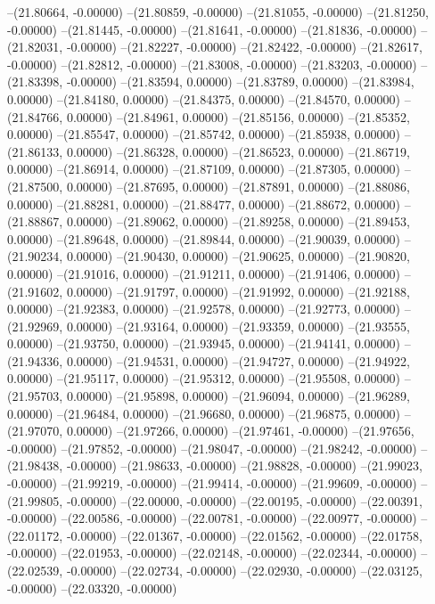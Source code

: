 --(21.80664, -0.00000)
--(21.80859, -0.00000)
--(21.81055, -0.00000)
--(21.81250, -0.00000)
--(21.81445, -0.00000)
--(21.81641, -0.00000)
--(21.81836, -0.00000)
--(21.82031, -0.00000)
--(21.82227, -0.00000)
--(21.82422, -0.00000)
--(21.82617, -0.00000)
--(21.82812, -0.00000)
--(21.83008, -0.00000)
--(21.83203, -0.00000)
--(21.83398, -0.00000)
--(21.83594, 0.00000)
--(21.83789, 0.00000)
--(21.83984, 0.00000)
--(21.84180, 0.00000)
--(21.84375, 0.00000)
--(21.84570, 0.00000)
--(21.84766, 0.00000)
--(21.84961, 0.00000)
--(21.85156, 0.00000)
--(21.85352, 0.00000)
--(21.85547, 0.00000)
--(21.85742, 0.00000)
--(21.85938, 0.00000)
--(21.86133, 0.00000)
--(21.86328, 0.00000)
--(21.86523, 0.00000)
--(21.86719, 0.00000)
--(21.86914, 0.00000)
--(21.87109, 0.00000)
--(21.87305, 0.00000)
--(21.87500, 0.00000)
--(21.87695, 0.00000)
--(21.87891, 0.00000)
--(21.88086, 0.00000)
--(21.88281, 0.00000)
--(21.88477, 0.00000)
--(21.88672, 0.00000)
--(21.88867, 0.00000)
--(21.89062, 0.00000)
--(21.89258, 0.00000)
--(21.89453, 0.00000)
--(21.89648, 0.00000)
--(21.89844, 0.00000)
--(21.90039, 0.00000)
--(21.90234, 0.00000)
--(21.90430, 0.00000)
--(21.90625, 0.00000)
--(21.90820, 0.00000)
--(21.91016, 0.00000)
--(21.91211, 0.00000)
--(21.91406, 0.00000)
--(21.91602, 0.00000)
--(21.91797, 0.00000)
--(21.91992, 0.00000)
--(21.92188, 0.00000)
--(21.92383, 0.00000)
--(21.92578, 0.00000)
--(21.92773, 0.00000)
--(21.92969, 0.00000)
--(21.93164, 0.00000)
--(21.93359, 0.00000)
--(21.93555, 0.00000)
--(21.93750, 0.00000)
--(21.93945, 0.00000)
--(21.94141, 0.00000)
--(21.94336, 0.00000)
--(21.94531, 0.00000)
--(21.94727, 0.00000)
--(21.94922, 0.00000)
--(21.95117, 0.00000)
--(21.95312, 0.00000)
--(21.95508, 0.00000)
--(21.95703, 0.00000)
--(21.95898, 0.00000)
--(21.96094, 0.00000)
--(21.96289, 0.00000)
--(21.96484, 0.00000)
--(21.96680, 0.00000)
--(21.96875, 0.00000)
--(21.97070, 0.00000)
--(21.97266, 0.00000)
--(21.97461, -0.00000)
--(21.97656, -0.00000)
--(21.97852, -0.00000)
--(21.98047, -0.00000)
--(21.98242, -0.00000)
--(21.98438, -0.00000)
--(21.98633, -0.00000)
--(21.98828, -0.00000)
--(21.99023, -0.00000)
--(21.99219, -0.00000)
--(21.99414, -0.00000)
--(21.99609, -0.00000)
--(21.99805, -0.00000)
--(22.00000, -0.00000)
--(22.00195, -0.00000)
--(22.00391, -0.00000)
--(22.00586, -0.00000)
--(22.00781, -0.00000)
--(22.00977, -0.00000)
--(22.01172, -0.00000)
--(22.01367, -0.00000)
--(22.01562, -0.00000)
--(22.01758, -0.00000)
--(22.01953, -0.00000)
--(22.02148, -0.00000)
--(22.02344, -0.00000)
--(22.02539, -0.00000)
--(22.02734, -0.00000)
--(22.02930, -0.00000)
--(22.03125, -0.00000)
--(22.03320, -0.00000)
